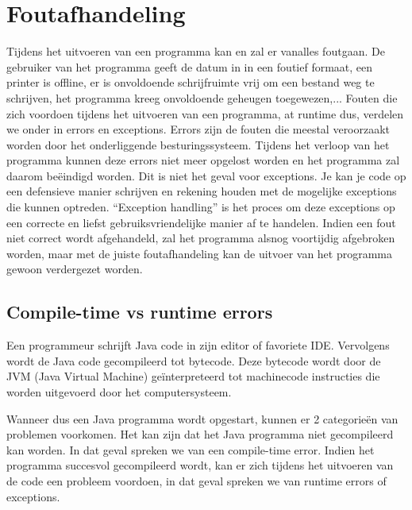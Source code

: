 \chapter{Foutafhandeling}

\begin{summary}
Tijdens het uitvoeren van een programma kan en zal er vanalles foutgaan. De gebruiker van het programma geeft de datum in in een foutief formaat, een printer is offline, er is onvoldoende schrijfruimte vrij om een bestand weg te schrijven, het programma kreeg onvoldoende geheugen toegewezen,... Fouten die zich voordoen tijdens het uitvoeren van een programma, at runtime dus, verdelen we onder in errors en exceptions. Errors zijn de fouten die meestal veroorzaakt worden door het onderliggende besturingssysteem. Tijdens het verloop van het programma kunnen deze errors niet meer opgelost worden en het programma zal daarom be\"eindigd worden. Dit is niet het geval voor exceptions. Je kan je code op een defensieve manier schrijven en rekening houden met de mogelijke exceptions die kunnen optreden. ``Exception handling'' is het proces om deze exceptions op een correcte en liefst gebruiksvriendelijke manier af te handelen. Indien een fout niet correct wordt afgehandeld, zal het programma alsnog voortijdig afgebroken worden, maar met de juiste foutafhandeling kan de uitvoer van het programma gewoon verdergezet worden. 
 \end{summary}
 
\section{Compile-time vs runtime errors}

Een programmeur schrijft Java code in zijn editor of favoriete IDE. Vervolgens wordt de Java code gecompileerd tot bytecode. Deze bytecode wordt door de JVM (Java Virtual Machine) ge\"interpreteerd tot machinecode instructies die worden uitgevoerd door het computersysteem.

Wanneer dus een Java programma wordt opgestart, kunnen er 2 categorie\"en van problemen voorkomen. Het kan zijn dat het Java programma niet gecompileerd kan worden. In dat geval spreken we van een compile-time error. Indien het programma succesvol gecompileerd wordt, kan er zich tijdens het uitvoeren van de code een probleem voordoen, in dat geval spreken we van runtime errors of exceptions. 

